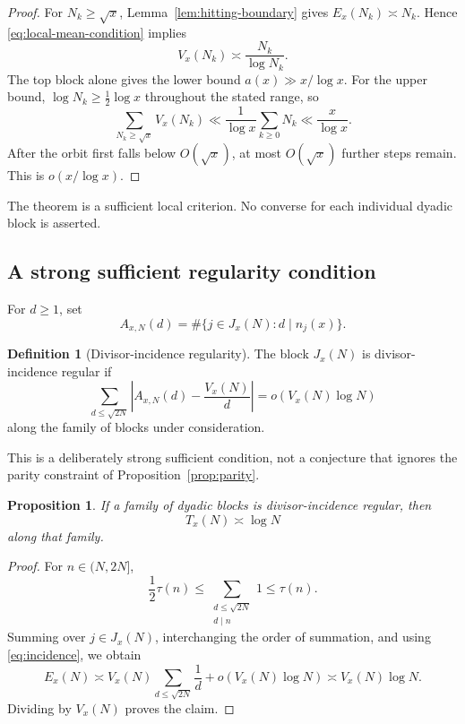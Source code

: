 \documentclass[11pt]{article}
\newtheorem{proposition}[theorem]{Proposition}
\theoremstyle{definition}
\newtheorem{definition}[theorem]{Definition}
\theoremstyle{remark}
\begin{document}
\begin{proof}
For $N_k\geq\sqrt x$, Lemma~\ref{lem:hitting-boundary} gives
$E_x(N_k)\asymp N_k$.  Hence \eqref{eq:local-mean-condition} implies
\[
 V_x(N_k)\asymp\frac{N_k}{\log N_k}.
\]
The top block alone gives the lower bound $a(x)\gg x/\log x$.
For the upper bound, $\log N_k\geq\tfrac12\log x$ throughout the stated
range, so
\[
 \sum_{N_k\geq\sqrt x}V_x(N_k)
 \ll\frac1{\log x}\sum_{k\geq0}N_k
 \ll\frac{x}{\log x}.
\]
After the orbit first falls below $O(\sqrt x)$, at most $O(\sqrt x)$
further steps remain.  This is $o(x/\log x)$.
\end{proof}

The theorem is a sufficient local criterion.  No converse for each
individual dyadic block is asserted.

\subsection{A strong sufficient regularity condition}

For $d\geq1$, set
\[
 A_{x,N}(d)=\#\{j\in J_x(N):d\mid n_j(x)\}.
\]

\begin{definition}[Divisor-incidence regularity]\label{def:incidence}
The block $J_x(N)$ is divisor-incidence regular if
\begin{equation}\label{eq:incidence}
 \sum_{d\leq\sqrt{2N}}
 \left|A_{x,N}(d)-\frac{V_x(N)}d\right|
 =o\!\left(V_x(N)\log N\right)
\end{equation}
along the family of blocks under consideration.
\end{definition}

This is a deliberately strong sufficient condition, not a conjecture
that ignores the parity constraint of Proposition~\ref{prop:parity}.

\begin{proposition}\label{prop:incidence-mean}
If a family of dyadic blocks is divisor-incidence regular, then
\[
 T_x(N)\asymp\log N
\]
along that family.
\end{proposition}

\begin{proof}
For $n\in(N,2N]$,
\[
 \frac12\tau(n)
 \leq\sum_{\substack{d\leq\sqrt{2N}\\d\mid n}}1
 \leq\tau(n).
\]
Summing over $j\in J_x(N)$, interchanging the order of summation, and
using \eqref{eq:incidence}, we obtain
\[
 E_x(N)
 \asymp V_x(N)\sum_{d\leq\sqrt{2N}}\frac1d
      +o(V_x(N)\log N)
 \asymp V_x(N)\log N.
\]
Dividing by $V_x(N)$ proves the claim.
\end{proof}
\end{document}

